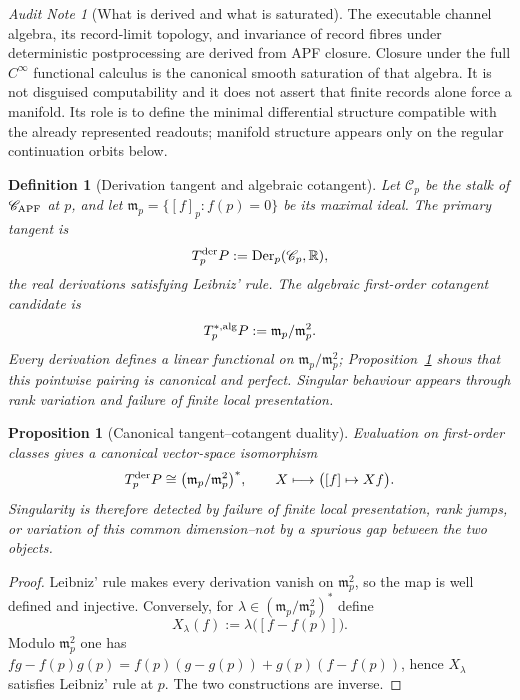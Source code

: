 \documentclass[11pt]{article}
\newtheorem{proposition}[theorem]{Proposition}
\newtheorem{definition}[theorem]{Definition}
\theoremstyle{remark}
\newtheorem{audit}[theorem]{Audit Note}
\begin{document}
\begin{audit}[What is derived and what is saturated]
The executable channel algebra, its record-limit topology, and invariance of
record fibres under deterministic postprocessing are derived from APF closure.
Closure under the full $C^\infty$ functional calculus is the canonical smooth
saturation of that algebra.  It is not disguised computability and it does not
assert that finite records alone force a manifold.  Its role is to define the
minimal differential structure compatible with the already represented
readouts; manifold structure appears only on the regular continuation orbits
below.
\end{audit}

\begin{definition}[Derivation tangent and algebraic cotangent]
\label{def:derivation-tangent}
Let $\mathscr C_p$ be the stalk of $\mathscr C_{\rm APF}$ at $p$, and let
$\mathfrak m_p=\{[f]_p:f(p)=0\}$ be its maximal ideal.  The primary tangent is
\[
        T_p^{\rm der}P
        :=\operatorname{Der}_p(\mathscr C_p,\mathbb R),
\]
the real derivations satisfying Leibniz' rule.  The algebraic first-order
cotangent candidate is
\[
        T^{*,\rm alg}_pP:=\mathfrak m_p/\mathfrak m_p^2.
\]
Every derivation defines a linear functional on
$\mathfrak m_p/\mathfrak m_p^2$; Proposition~\ref{prop:derivation-cotangent-pairing}
shows that this pointwise pairing is canonical and perfect.  Singular behaviour
appears through rank variation and failure of finite local presentation.
\end{definition}

\begin{proposition}[Canonical tangent--cotangent duality]
\label{prop:derivation-cotangent-pairing}
Evaluation on first-order classes gives a canonical vector-space isomorphism
\[
 T_p^{\rm der}P
 \cong
 \bigl(\mathfrak m_p/\mathfrak m_p^2\bigr)^*,
 \qquad
 X\longmapsto\bigl([f]\mapsto Xf\bigr).
\]
Singularity is therefore detected by failure of finite local presentation,
rank jumps, or variation of this common dimension--not by a spurious gap
between the two objects.
\end{proposition}

\begin{proof}
Leibniz' rule makes every derivation vanish on $\mathfrak m_p^2$, so the map is
well defined and injective.  Conversely, for
$\lambda\in(\mathfrak m_p/\mathfrak m_p^2)^*$ define
\[
X_\lambda(f):=\lambda\bigl([f-f(p)]\bigr).
\]
Modulo $\mathfrak m_p^2$ one has
$fg-f(p)g(p)=f(p)(g-g(p))+g(p)(f-f(p))$, hence $X_\lambda$ satisfies Leibniz'
rule at $p$.  The two constructions are inverse.
\end{proof}
\end{document}
